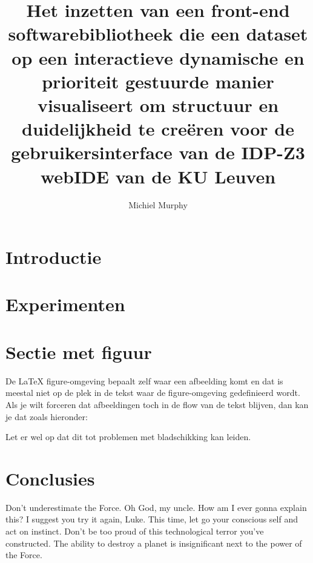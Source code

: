 \documentclass[a0,portrait]{hogent-poster}
\title{Het inzetten van een front-end softwarebibliotheek die een dataset op een interactieve dynamische en prioriteit gestuurde manier visualiseert om structuur en duidelijkheid te creëren voor de gebruikersinterface van de IDP-Z3 webIDE van de KU Leuven}
\author{Michiel Murphy}
\begin{document}
\maketitle

\begin{abstract}

\end{abstract}

\begin{multicols}{2} %

\section{Introductie}




\section{Experimenten}



\section{Sectie met figuur}

De {\LaTeX} figure-omgeving bepaalt zelf waar een afbeelding komt en dat is meestal niet op de plek in de tekst waar de figure-omgeving gedefinieerd wordt. Als je wilt forceren dat afbeeldingen toch in de flow van de tekst blijven, dan kan je dat zoals hieronder:



Let er wel op dat dit tot problemen met bladschikking kan leiden.

\section{Conclusies}

Don't underestimate the Force. Oh God, my uncle. How am I ever gonna explain this? I suggest you try it again, Luke. This time, let go your conscious self and act on instinct. Don't be too proud of this technological terror you've constructed. The ability to destroy a planet is insignificant next to the power of the Force.


\end{multicols}
\end{document}
